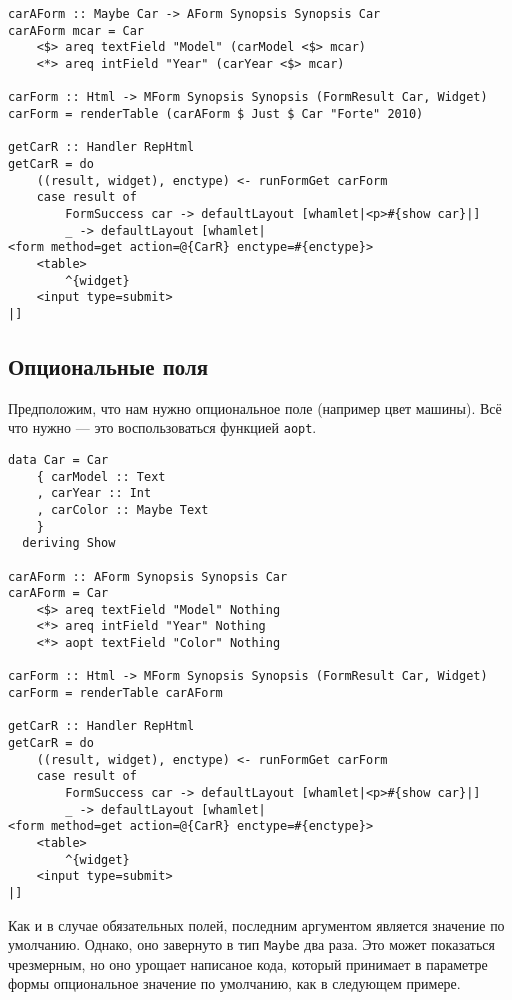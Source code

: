 \begin{lstlisting}[caption={Формы со значениями по умолчанию}]
carAForm :: Maybe Car -> AForm Synopsis Synopsis Car
carAForm mcar = Car
    <$> areq textField "Model" (carModel <$> mcar)
    <*> areq intField "Year" (carYear <$> mcar)

carForm :: Html -> MForm Synopsis Synopsis (FormResult Car, Widget)
carForm = renderTable (carAForm $ Just $ Car "Forte" 2010)

getCarR :: Handler RepHtml
getCarR = do
    ((result, widget), enctype) <- runFormGet carForm
    case result of
        FormSuccess car -> defaultLayout [whamlet|<p>#{show car}|]
        _ -> defaultLayout [whamlet|
<form method=get action=@{CarR} enctype=#{enctype}>
    <table>
        ^{widget}
    <input type=submit>
|]
\end{lstlisting}

\subsection{Опциональные поля}
Предположим, что нам нужно опциональное поле (например цвет машины). Всё что нужно ---
это воспользоваться функцией \lstinline'aopt'.
\begin{lstlisting}[caption={Опциональные поля}]
data Car = Car
    { carModel :: Text
    , carYear :: Int
    , carColor :: Maybe Text
    }
  deriving Show

carAForm :: AForm Synopsis Synopsis Car
carAForm = Car
    <$> areq textField "Model" Nothing
    <*> areq intField "Year" Nothing
    <*> aopt textField "Color" Nothing

carForm :: Html -> MForm Synopsis Synopsis (FormResult Car, Widget)
carForm = renderTable carAForm

getCarR :: Handler RepHtml
getCarR = do
    ((result, widget), enctype) <- runFormGet carForm
    case result of
        FormSuccess car -> defaultLayout [whamlet|<p>#{show car}|]
        _ -> defaultLayout [whamlet|
<form method=get action=@{CarR} enctype=#{enctype}>
    <table>
        ^{widget}
    <input type=submit>
|]
\end{lstlisting}
Как и в случае обязательных полей, последним аргументом является значение по умолчанию.
Однако, оно завернуто в тип \lstinline'Maybe' два раза. Это может показаться чрезмерным,
но оно урощает написаное кода, который принимает в параметре формы опциональное значение
по умолчанию, как в следующем примере.

